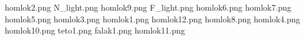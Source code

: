 homlok2.png
N_light.png
homlok9.png
F_light.png
homlok6.png
homlok7.png
homlok5.png
homlok3.png
homlok1.png
homlok12.png
homlok8.png
homlok4.png
homlok10.png
teto1.png
falak1.png
homlok11.png
